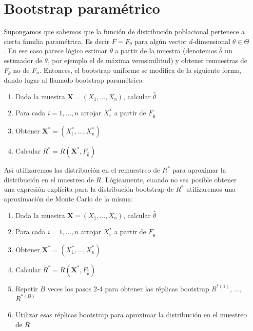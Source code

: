 \documentclass[]{book}
\theoremstyle{definition}
\theoremstyle{definition}
\theoremstyle{definition}
\theoremstyle{remark}
\begin{document}
\section{Bootstrap paramétrico}\label{cap4-boot-par}

Supongamos que sabemos que la función de distribución poblacional
pertenece a cierta familia paramétrica. Es decir \(F=F_{\theta }\) para
algún vector \(d\)-dimensional \(\theta \in \Theta\). En ese caso parece
lógico estimar \(\theta\) a partir de la muestra (denotemos
\(\hat{\theta}\) un estimador de \(\theta\), por ejemplo el de máxima
verosimilitud) y obtener remuestras de \(F_{\hat{\theta}}\) no de
\(F_n\). Entonces, el bootstrap uniforme se modifica de la siguiente
forma, dando lugar al llamado bootstrap paramétrico:

\begin{enumerate}
\def\labelenumi{\arabic{enumi}.}
\item
  Dada la muestra \(\mathbf{X}=\left( X_1,\ldots ,X_n \right)\),
  calcular \(\hat{\theta}\)
\item
  Para cada \(i=1,\ldots ,n\) arrojar \(X_i^{\ast}\) a partir de
  \(F_{\hat{\theta}}\)
\item
  Obtener
  \(\mathbf{X}^{\ast}=\left( X_1^{\ast},\ldots ,X_n^{\ast} \right)\)
\item
  Calcular
  \(R^{\ast}=R\left( \mathbf{X}^{\ast},F_{\hat{\theta}} \right)\)
\end{enumerate}

Así utilizaremos las distribución en el remuestreo de \(R^{\ast}\) para
aproximar la distribución en el muestreo de \(R\). Lógicamente, cuando
no sea posible obtener una expresión explícita para la distribución
bootstrap de \(R^{\ast}\) utilizaremos una aproximación de Monte Carlo
de la misma:

\begin{enumerate}
\def\labelenumi{\arabic{enumi}.}
\item
  Dada la muestra \(\mathbf{X}=\left( X_1,\ldots ,X_n \right)\),
  calcular \(\hat{\theta}\)
\item
  Para cada \(i=1,\ldots ,n\) arrojar \(X_i^{\ast}\) a partir de
  \(F_{\hat{\theta}}\)
\item
  Obtener
  \(\mathbf{X}^{\ast}=\left( X_1^{\ast},\ldots ,X_n^{\ast} \right)\)
\item
  Calcular
  \(R^{\ast}=R\left( \mathbf{X}^{\ast},F_{\hat{\theta} } \right)\)
\item
  Repetir \(B\) veces los pasos 2-4 para obtener las réplicas bootstrap
  \(R^{\ast (1)}\), \(\ldots\), \(R^{\ast (B)}\)
\item
  Utilizar esas réplicas bootstrap para aproximar la distribución en el
  muestreo de \(R\)
\end{enumerate}
\end{document}
